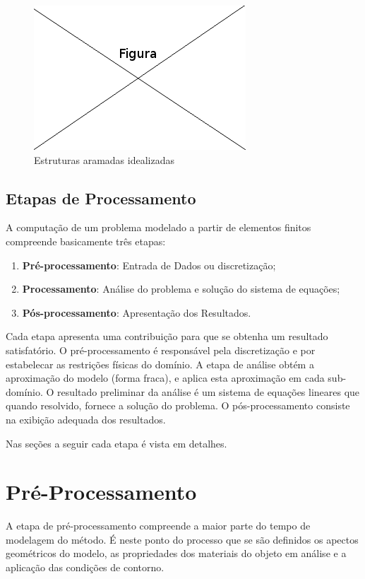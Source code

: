\begin{figure}[!htb]
\centering
\includegraphics[scale=0.5]{figuras/temp.png}
\caption{Estruturas aramadas idealizadas}
\label{fig:arame}
\end{figure}





\subsection{Etapas de Processamento}
A computação de um problema modelado a partir de elementos finitos compreende basicamente três etapas: 
\begin{enumerate}  
\item \textbf{Pré-processamento}: Entrada de Dados ou discretização;
\item \textbf{Processamento}: Análise do problema e  solução do sistema de equações;
\item \textbf{Pós-processamento}: Apresentação dos Resultados. 
\end{enumerate}

Cada etapa apresenta uma contribuição para que se obtenha um resultado satisfatório. O pré-processamento é responsável pela discretização e por estabelecar as restrições físicas do domínio. A etapa de análise obtém a aproximação do modelo (forma fraca), e aplica esta aproximação em cada sub-domínio. O resultado preliminar da análise é um sistema de equações lineares que quando resolvido, fornece a solução do problema.  O pós-processamento consiste na exibição adequada dos resultados.
\citep[p. 665, 666]{zien}


Nas seções a seguir cada etapa é vista em detalhes.

\section{Pré-Processamento}

A etapa de pré-processamento compreende a maior parte do tempo de modelagem do método. É neste ponto do processo que se são definidos os apectos geométricos do modelo, as propriedades dos materiais do objeto em análise e a aplicação das condições de contorno. \citep[p. 9, 665]{zien}

